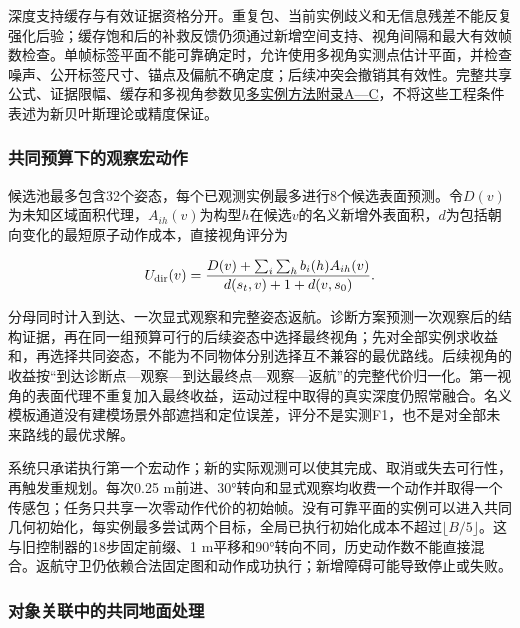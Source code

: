 \documentclass[11pt,a4paper]{article}
\numberwithin{equation}{section}
\begin{document}
深度支持缓存与有效证据资格分开。重复包、当前实例歧义和无信息残差不能反复强化后验；缓存饱和后的补救反馈仍须通过新增空间支持、视角间隔和最大有效帧数检查。单帧标签平面不能可靠确定时，允许使用多视角实测点估计平面，并检查噪声、公开标签尺寸、锚点及偏航不确定度；后续冲突会撤销其有效性。完整共享公式、证据限幅、缓存和多视角参数见\href{/root/NSO/docs/thesis/ARTICLE_MULTI_INSTANCE_METHOD_APPENDIX_20260928.md}{多实例方法附录A---C}，不将这些工程条件表述为新贝叶斯理论或精度保证。

\hypertarget{ux5171ux540cux9884ux7b97ux4e0bux7684ux89c2ux5bdfux5b8fux52a8ux4f5c}{%
\subsubsection{共同预算下的观察宏动作}\label{ux5171ux540cux9884ux7b97ux4e0bux7684ux89c2ux5bdfux5b8fux52a8ux4f5c}}

候选池最多包含32个姿态，每个已观测实例最多进行8个候选表面预测。令\(D(v)\)为未知区域面积代理，\(A_{ih}(v)\)为构型\(h\)在候选\(v\)的名义新增外表面积，\(d\)为包括朝向变化的最短原子动作成本，直接视角评分为

\begin{equation}
U_{\rm dir}(v)=\frac{D(v)+\sum_i\sum_h b_i(h)A_{ih}(v)}
{d(s_t,v)+1+d(v,s_0)}.
\end{equation}

分母同时计入到达、一次显式观察和完整姿态返航。诊断方案预测一次观察后的结构证据，再在同一组预算可行的后续姿态中选择最终视角；先对全部实例求收益和，再选择共同姿态，不能为不同物体分别选择互不兼容的最优路线。后续视角的收益按``到达诊断点---观察---到达最终点---观察---返航''的完整代价归一化。第一视角的表面代理不重复加入最终收益，运动过程中取得的真实深度仍照常融合。名义模板通道没有建模场景外部遮挡和定位误差，评分不是实测F1，也不是对全部未来路线的最优求解。

系统只承诺执行第一个宏动作；新的实际观测可以使其完成、取消或失去可行性，再触发重规划。每次0.25 m前进、30°转向和显式观察均收费一个动作并取得一个传感包；任务只共享一次零动作代价的初始帧。没有可靠平面的实例可以进入共同几何初始化，每实例最多尝试两个目标，全局已执行初始化成本不超过\(\lfloor B/5\rfloor\)。这与旧控制器的18步固定前缀、1 m平移和90°转向不同，历史动作数不能直接混合。返航守卫仍依赖合法固定图和动作成功执行；新增障碍可能导致停止或失败。

\hypertarget{ux5bf9ux8c61ux5173ux8054ux4e2dux7684ux5171ux540cux5730ux9762ux5904ux7406}{%
\subsubsection{对象关联中的共同地面处理}\label{ux5bf9ux8c61ux5173ux8054ux4e2dux7684ux5171ux540cux5730ux9762ux5904ux7406}}
\end{document}
